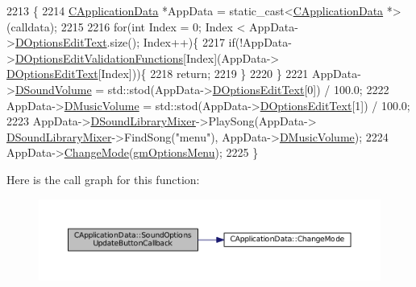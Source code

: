 \begin{DoxyCode}
2213                                                                      \{
2214     \hyperlink{classCApplicationData}{CApplicationData} *AppData = \textcolor{keyword}{static\_cast<}\hyperlink{classCApplicationData}{CApplicationData} *\textcolor{keyword}{>}(calldata);
2215     
2216     \textcolor{keywordflow}{for}(\textcolor{keywordtype}{int} Index = 0; Index < AppData->\hyperlink{classCApplicationData_a7044dc34cbd9d6776e8ef79eb12b5ce4}{DOptionsEditText}.size(); Index++)\{
2217         \textcolor{keywordflow}{if}(!AppData->\hyperlink{classCApplicationData_ab76fa444142de66fdb058f390e01112c}{DOptionsEditValidationFunctions}[Index](AppData->
      \hyperlink{classCApplicationData_a7044dc34cbd9d6776e8ef79eb12b5ce4}{DOptionsEditText}[Index]))\{
2218             \textcolor{keywordflow}{return};   
2219         \}
2220     \}
2221     AppData->\hyperlink{classCApplicationData_aa6e540f860dcb1929ef36ddce3be3691}{DSoundVolume} = std::stod(AppData->\hyperlink{classCApplicationData_a7044dc34cbd9d6776e8ef79eb12b5ce4}{DOptionsEditText}[0]) / 100.0;
2222     AppData->\hyperlink{classCApplicationData_a8bc61af4a83a667102e55cca2a739c3b}{DMusicVolume} = std::stod(AppData->\hyperlink{classCApplicationData_a7044dc34cbd9d6776e8ef79eb12b5ce4}{DOptionsEditText}[1]) / 100.0;
2223     AppData->\hyperlink{classCApplicationData_aa1e6876121bb4fb229ec6b930a8a6766}{DSoundLibraryMixer}->PlaySong(AppData->
      \hyperlink{classCApplicationData_aa1e6876121bb4fb229ec6b930a8a6766}{DSoundLibraryMixer}->FindSong(\textcolor{stringliteral}{"menu"}), AppData->\hyperlink{classCApplicationData_a8bc61af4a83a667102e55cca2a739c3b}{DMusicVolume});   
2224     AppData->\hyperlink{classCApplicationData_aee18c113e9a0acb3cad3d63eb19de71b}{ChangeMode}(\hyperlink{classCApplicationData_ac8ac37a4c8bb871036fbbdc6a072e403a81d2e5abad73eae4325b5ee0cc69fa3e}{gmOptionsMenu});
2225 \}
\end{DoxyCode}
Here is the call graph for this function\+:
\nopagebreak
\begin{figure}[H]
\begin{center}
\leavevmode
\includegraphics[width=350pt]{classCApplicationData_ae63c8ca19ddeb92a3aaf0a5d67d09e58_cgraph}
\end{center}
\end{figure}
